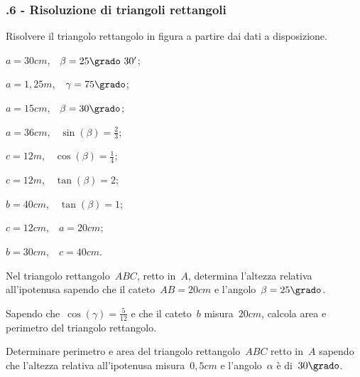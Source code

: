 \subsubsection*{\thechapter.6 - Risoluzione di triangoli rettangoli}

\begin{esercizio}
\label{ese:G.7}%
Risolvere il triangolo rettangolo in figura a partire dai dati a disposizione.
\begin{multicols}{2}
\begin{center}
 
\end{center}
\begin{enumeratea}
 \item $a=30\unit{cm}$,$\quad\beta=25\grado~30'$;
 \item $a=1,25\unit{m}$,$\quad\gamma=75\grado$;
 \item $a=15\unit{cm}$,$\quad\beta=30\grado$;
 \item $a=36\unit{cm}$,$\quad\sin(\beta)=\frac{2}{3}$;
 \item $c=12\unit{m}$,$\quad\cos(\beta)=\frac{1}{4}$;
 \item $c=12\unit{m}$,$\quad\tan(\beta)=2$;
 \item $b=40\unit{cm}$,$\quad\tan(\beta)=1$;
 \item $c=12\unit{cm}$,$\quad a=20\unit{cm}$;
 \item $b=30\unit{cm}$,$\quad c=40\unit{cm}$.
\end{enumeratea}
\end{multicols}
\end{esercizio}

\begin{esercizio}
\label{ese:G.8}
Nel triangolo rettangolo~$ABC$, retto in~$A$, determina l'altezza relativa all'ipotenusa sapendo che il cateto~${AB} = 20\unit{cm}$
e l'angolo~$\beta=25\grado$.
\end{esercizio}

\begin{esercizio}
\label{ese:G.9}
Sapendo che~$\cos(\gamma)=\frac{5}{12}$ e che il cateto~$b$ misura~$20\unit{cm}$, calcola area e perimetro del triangolo rettangolo.
\end{esercizio}

\begin{esercizio}
\label{ese:G.10}
Determinare perimetro e area del triangolo rettangolo~$ABC$ retto in~$A$ sapendo che l'altezza relativa all'ipotenusa misura~$0,5\unit{cm}$
e l'angolo~$\alpha$ è di~$30\grado$.
\end{esercizio}

